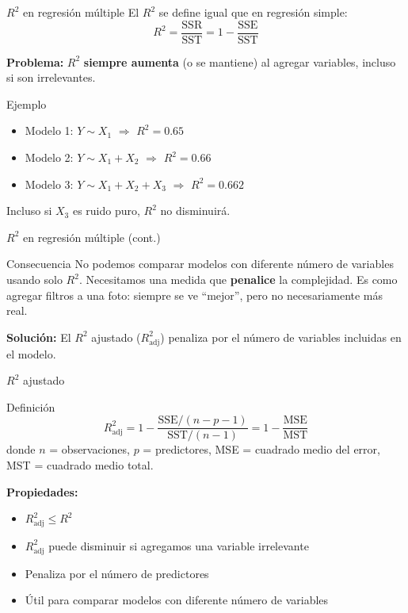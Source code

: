 \documentclass[aspectratio=169, 11pt]{beamer}
\begin{document}
\begin{frame}{$R^2$ en regresi\'on m\'ultiple}
El $R^2$ se define igual que en regresi\'on simple:
\[
R^2 = \frac{\text{SSR}}{\text{SST}} = 1 - \frac{\text{SSE}}{\text{SST}}
\]

\vspace{0.2cm}
\textbf{Problema:} $R^2$ \textbf{siempre aumenta} (o se mantiene) al agregar variables, incluso si son irrelevantes.

\vspace{0.2cm}
\begin{exampleblock}{Ejemplo}
\begin{itemize}
  \item Modelo 1: $Y \sim X_1$ $\Rightarrow$ $R^2 = 0.65$
  \item Modelo 2: $Y \sim X_1 + X_2$ $\Rightarrow$ $R^2 = 0.66$
  \item Modelo 3: $Y \sim X_1 + X_2 + X_3$ $\Rightarrow$ $R^2 = 0.662$
\end{itemize}
Incluso si $X_3$ es ruido puro, $R^2$ no disminuir\'a.
\end{exampleblock}
\end{frame}

\begin{frame}{$R^2$ en regresi\'on m\'ultiple (cont.)}
\begin{alertblock}{Consecuencia}
No podemos comparar modelos con diferente n\'umero de variables usando solo $R^2$. Necesitamos una medida que \textbf{penalice} la complejidad. Es como agregar filtros a una foto: siempre se ve ``mejor'', pero no necesariamente m\'as real.
\end{alertblock}

\vspace{0.3cm}
\textbf{Soluci\'on:} El $R^2$ ajustado ($R^2_{\text{adj}}$) penaliza por el n\'umero de variables incluidas en el modelo.
\end{frame}

\begin{frame}{$R^2$ ajustado}
\begin{block}{Definici\'on}
\[
R^2_{\text{adj}} = 1 - \frac{\text{SSE}/(n - p - 1)}{\text{SST}/(n - 1)} = 1 - \frac{\text{MSE}}{\text{MST}}
\]
donde $n$ = observaciones, $p$ = predictores, MSE = cuadrado medio del error, MST = cuadrado medio total.
\end{block}

\vspace{0.1cm}
\textbf{Propiedades:}
\begin{itemize}
  \item $R^2_{\text{adj}} \leq R^2$
  \item $R^2_{\text{adj}}$ puede disminuir si agregamos una variable irrelevante
  \item Penaliza por el n\'umero de predictores
  \item \'Util para comparar modelos con diferente n\'umero de variables
\end{itemize}
\end{frame}
\end{document}

